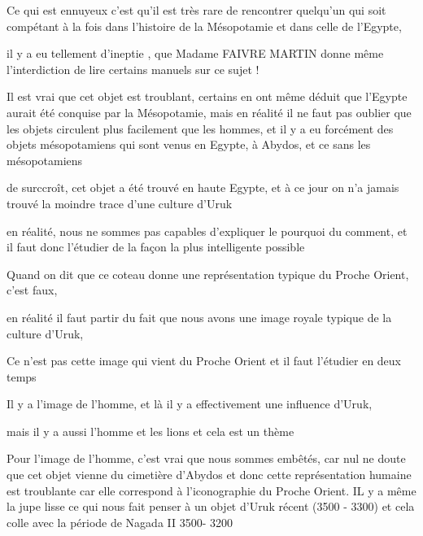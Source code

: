 \documentclass[a4paper]{article}
\begin{document}
\bigskip


\bigskip

{
Ce qui est ennuyeux c'est qu'il est très rare de rencontrer quelqu'un qui soit compétant à la fois dans l'histoire de la
Mésopotamie et dans celle de l'Egypte, }

{
il y a eu tellement d'ineptie , que Madame FAIVRE MARTIN donne même l'interdiction de lire certains manuels sur ce sujet
!}


\bigskip

{
Il est vrai que cet objet est troublant, certains en ont même déduit que l'Egypte aurait été conquise par la
Mésopotamie, mais en réalité il ne faut pas oublier que les objets circulent plus facilement que les hommes, et il y a
eu forcément des objets mésopotamiens qui sont venus en Egypte, à Abydos, et ce sans les mésopotamiens}

{
de surccroît, cet objet a été trouvé en haute Egypte, et à ce jour on n'a jamais trouvé la moindre trace d'une culture
d'Uruk}


\bigskip

{
en réalité, nous ne sommes pas capables d'expliquer le pourquoi du comment, et il faut donc l'étudier de la façon la
plus intelligente possible}

{
Quand on dit que ce coteau donne une représentation typique du Proche Orient, c'est faux, }


\bigskip

{
en réalité il faut partir du fait que nous avons une image royale typique de la culture d'Uruk, }

{
Ce n'est pas cette image qui vient du Proche Orient et il faut l'étudier en deux temps}

{
Il y a l'image de l'homme, et là il y a effectivement une influence d'Uruk, }

{
mais il y a aussi l'homme et les lions et cela est un thème}


\bigskip

{
Pour l'image de l'homme, c'est vrai que nous sommes embêtés, car nul ne doute que cet objet vienne du cimetière d'Abydos
et donc cette représentation humaine est troublante car elle correspond à l'iconographie du Proche Orient. IL y a même
la jupe lisse ce qui nous fait penser à un objet d'Uruk récent (3500 - 3300) et cela colle avec la période de Nagada II
3500- 3200}
\end{document}
